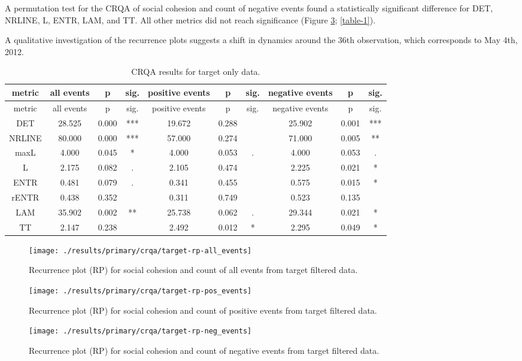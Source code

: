\documentclass[english,man]{apa6}
\begin{document}
A permutation test for the CRQA of social cohesion and
count of negative events found a statistically significant difference for DET,
NRLINE, L, ENTR, LAM, and TT. All other metrics did not reach significance
(Figure \ref{fig:plot-rp-targ-neg}; \autoref{table-1}).

A qualitative investigation of the recurrence plots suggests
a shift in dynamics around the 36th observation,
which corresponds to May 4th, 2012.

\begin{longtable}[]{@{}cccccccccc@{}}
\caption{\label{table-1}CRQA results for target only data.}\tabularnewline
\toprule
metric & all events & p & sig. & positive events & p & sig. & negative events & p & sig.\tabularnewline
\midrule
\endfirsthead
\toprule
metric & all events & p & sig. & positive events & p & sig. & negative events & p & sig.\tabularnewline
\midrule
\endhead
DET & 28.525 & 0.000 & *** & 19.672 & 0.288 & & 25.902 & 0.001 & ***\tabularnewline
NRLINE & 80.000 & 0.000 & *** & 57.000 & 0.274 & & 71.000 & 0.005 & **\tabularnewline
maxL & 4.000 & 0.045 & * & 4.000 & 0.053 & . & 4.000 & 0.053 & .\tabularnewline
L & 2.175 & 0.082 & . & 2.105 & 0.474 & & 2.225 & 0.021 & *\tabularnewline
ENTR & 0.481 & 0.079 & . & 0.341 & 0.455 & & 0.575 & 0.015 & *\tabularnewline
rENTR & 0.438 & 0.352 & & 0.311 & 0.749 & & 0.523 & 0.135 &\tabularnewline
LAM & 35.902 & 0.002 & ** & 25.738 & 0.062 & . & 29.344 & 0.021 & *\tabularnewline
TT & 2.147 & 0.238 & & 2.492 & 0.012 & * & 2.295 & 0.049 & *\tabularnewline
\bottomrule
\end{longtable}

\begin{figure}
\texttt{[image: ./results/primary/crqa/target-rp-all\_events]} \caption{Recurrence plot (RP) for social cohesion and count of all events from target filtered data.}\label{fig:plot-rp-targ-all}
\end{figure}

\begin{figure}
\texttt{[image: ./results/primary/crqa/target-rp-pos\_events]} \caption{Recurrence plot (RP) for social cohesion and count of positive events from target filtered data.}\label{fig:plot-rp-targ-pos}
\end{figure}

\begin{figure}
\texttt{[image: ./results/primary/crqa/target-rp-neg\_events]} \caption{Recurrence plot (RP) for social cohesion and count of negative events from target filtered data.}\label{fig:plot-rp-targ-neg}
\end{figure}
\end{document}
